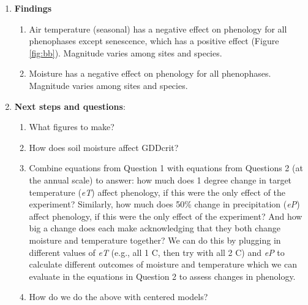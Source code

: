 \documentclass{article}
\begin{document}
\begin{singlespace}
\begin{enumerate}
\item{\textbf{Findings}}
\begin{enumerate}
\item{Air temperature (seasonal) has a negative effect on phenology for all phenophases except senescence, which has a positive effect (Figure \ref{fig:bb}). Magnitude varies among sites and species.}
\item{Moisture has a negative effect on phenology for all phenophases. Magnitude varies among sites and species. }
\end{enumerate}

\item{\textbf{Next steps and questions}}: 
\begin{enumerate}
\item{What figures to make?}
\item{How does soil moisture affect GDDcrit?}
\item Combine equations from Question 1 with equations from Questions 2 (at the annual scale) to answer: how much does 1 degree change in target temperature (\textit{eT}) affect phenology, if this were the only effect of the experiment? Similarly, how much does 50\% change in precipitation (\textit{eP}) affect phenology, if this were the only effect of the experiment? And how big a change does each make acknowledging that they both change moisture and temperature together? We can do this by plugging in different values of \textit{eT} (e.g., all 1 C, then try with all 2 C) and \textit{eP} to calculate different outcomes of moisture and temperature which we can evaluate in the equations in Question 2 to assess changes in phenology.
\item{How do we do the above with centered models?}
\end{enumerate}

\end{enumerate}
\end{singlespace}
\end{document}
